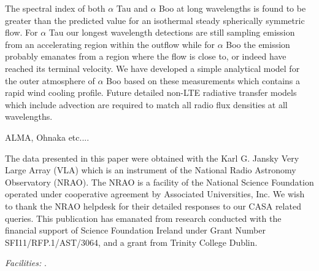 \documentclass[iop]{emulateapj}
\begin{document}
The spectral index of both $\alpha$ Tau and $\alpha$ Boo at long wavelengths is found to be greater than the predicted value for an isothermal steady spherically symmetric flow. For $\alpha$ Tau our longest wavelength detections are still sampling emission from an accelerating region within the outflow while for $\alpha$ Boo the emission probably emanates from a region where the flow is close to, or indeed have reached its terminal velocity. We have developed a simple analytical model for the outer atmosphere of $\alpha$ Boo based on these measurements which contains a rapid wind cooling profile. Future detailed non-LTE radiative transfer models which include advection are required to match all radio flux densities at all wavelengths. 

ALMA, Ohnaka etc....

\acknowledgments
The data presented in this paper were obtained with the Karl G. Jansky Very Large Array (VLA) which is an instrument of the National Radio Astronomy Observatory (NRAO). The NRAO is a facility of the National Science Foundation operated under cooperative agreement by Associated Universities, Inc. We wish to thank the NRAO helpdesk for their detailed responses to our CASA related queries. This publication has emanated from research conducted with the financial support of Science Foundation Ireland under Grant Number SFI11/RFP.1/AST/3064, and a grant from Trinity College Dublin.

{\it Facilities:} .




\end{document}
